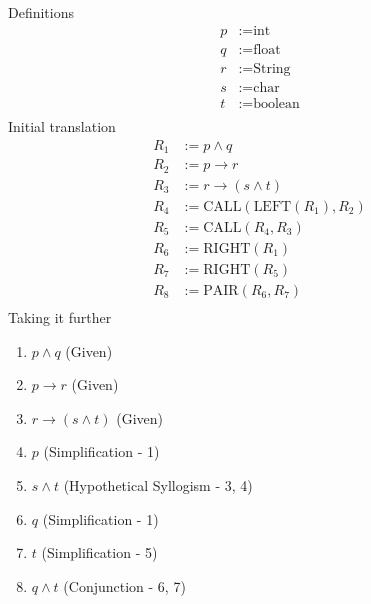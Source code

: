 \documentclass[11pt]{article}
\makeatletter
\def\imp{\rightarrow}
\renewenvironment{proof}[1][\proofname]{\par
  \normalfont \topsep6\p@\@plus6\p@\relax
  \trivlist
  \item[\hskip\labelsep
        \itshape
    #1\@addpunct{.}]\ignorespaces
}{%
  \endtrivlist\@endpefalse
}
\makeatother
\begin{document}
\subsection{} %
Definitions
\begin{align*}
	p &:= \text{int} \\
	q &:= \text{float} \\
	r &:= \text{String} \\
	s &:= \text{char} \\
	t &:= \text{boolean} \\
\end{align*}
Initial translation
\begin{align*}
	R_1 &:= p \land q \\
	R_2 &:= p \imp r \\
	R_3 &:= r \imp (s \land t) \\
	R_4 &:= \text{CALL}(\text{LEFT}(R_1), R_2) \tag*{// $r$} \\
	R_5 &:= \text{CALL}(R_4, R_3) \tag*{// ($s \land t$)} \\
	R_6 &:= \text{RIGHT}(R_1) \tag*{// $q$} \\
	R_7 &:= \text{RIGHT}(R_5) \tag*{// $t$} \\
	R_8 &:= \text{PAIR}(R_6, R_7) \tag*{// ($q \land t$)} \\
\end{align*}
Taking it further
\begin{proof}[\textbf{Prove $q \land t$}] \leavevmode
 	\begin{enumerate}
		\item $p \land q$ \hfill (Given)
		\item $p \imp r$ \hfill (Given)
		\item $r \imp (s \land t)$ \hfill (Given)
		\item $p$ \hfill (Simplification - 1)
		\item $s \land t$ \hfill (Hypothetical Syllogism - 3, 4)
		\item $q$ \hfill (Simplification - 1)
		\item $t$ \hfill (Simplification - 5)
		\item $q \land t$ \hfill (Conjunction - 6, 7)
	\end{enumerate}
\end{proof}
\end{document}
